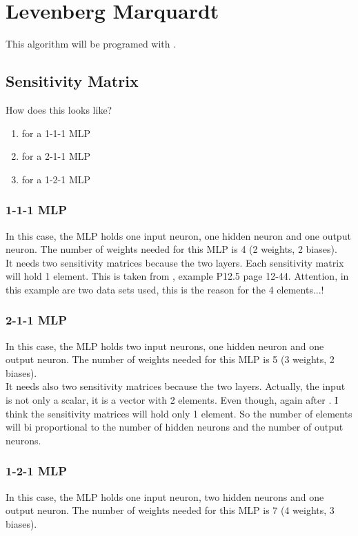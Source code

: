 \section{Levenberg Marquardt}
This algorithm will be programed with \cite{4}.

\subsection{Sensitivity Matrix}
How does this looks like?\\
\begin{enumerate}
	\item for a 1-1-1 MLP
	\item for a 2-1-1 MLP
	\item for a 1-2-1 MLP
\end{enumerate}

\subsubsection{1-1-1 MLP}
In this case, the MLP holds one input neuron, one hidden neuron and one output neuron. The number of weights needed for this MLP is 4 (2 weights, 2 biases).\\

It needs two sensitivity matrices because the two layers. Each sensitivity matrix will hold 1 element.
This is taken from \cite{4}, example P12.5 page 12-44. Attention, in this example are two data sets used, this is the reason for the 4 elements...!

\subsubsection{2-1-1 MLP}
In this case, the MLP holds two input neurons, one hidden neuron and one output neuron. The number of weights needed for this MLP is 5 (3 weights, 2 biases).\\

It needs also two sensitivity matrices because the two layers. Actually, the input is not only a scalar, it is a vector with 2 elements. Even though, again after \cite{4}. I think the sensitivity matrices will hold only 1 element. So the number of elements will bi proportional to the number of hidden neurons and the number of output neurons.

\subsubsection{1-2-1 MLP}
In this case, the MLP holds one input neuron, two hidden neurons and one output neuron. The number of weights needed for this MLP is 7 (4 weights, 3 biases).\\

